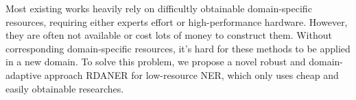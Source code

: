 \documentclass[10pt, conference, compsocconf]{IEEEtran}
\newcommand{\bert}{\textsc{Bert}\xspace}
\newcommand{\scibert}{\textsc{SciBert}\xspace}
\newcommand{\biobert}{\textsc{BioBert}\xspace}
\newcommand{\rdaner}{\textsc{RDANER}\xspace}
\begin{document}




Most existing works heavily rely on difficultly obtainable domain-specific resources, requiring either experts effort or  
high-performance hardware. However, they are often not available or cost lots of money to 
construct them. Without corresponding domain-specific resources, 
it's hard for these methods to be applied in a new domain.
To solve this problem, we propose a novel robust and domain-adaptive approach \rdaner for low-resource
NER, which only uses cheap and easily obtainable researches.
\end{document}
